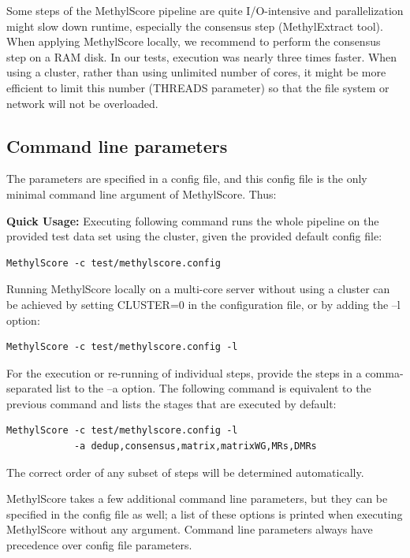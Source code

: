 \documentclass{article}
\begin{document}
Some steps of the MethylScore pipeline are quite I/O-intensive and parallelization might slow down runtime, especially the consensus step (MethylExtract tool). 
When applying MethylScore locally, we recommend to perform the consensus step on a RAM disk. In our tests, execution was nearly three times faster. When using a cluster, rather than using unlimited number of cores, it might be more efficient to limit this number (THREADS parameter) so that the file system or network will not be overloaded.

\subsection{Command line parameters}
\label{params}

The parameters are specified in a config file, and this config file is the only minimal command line argument of MethylScore. Thus:\\

\label{QuickUsage}
\textbf{Quick Usage:} Executing following command runs the whole pipeline on the provided test data set using the cluster, given the provided default config file:
\begin{lstlisting}
MethylScore -c test/methylscore.config
\end{lstlisting}

Running MethylScore locally on a multi-core server without using a cluster can be achieved by setting CLUSTER=0 in the configuration file, or by adding the --l option:
\begin{lstlisting}
MethylScore -c test/methylscore.config -l
\end{lstlisting}

For the execution or re-running of individual steps, provide the steps in a comma-separated list to the --a option. The following command is equivalent to the previous command and lists the stages that are executed by default:
\begin{lstlisting}
MethylScore -c test/methylscore.config -l
            -a dedup,consensus,matrix,matrixWG,MRs,DMRs
\end{lstlisting}
The correct order of any subset of steps will be determined automatically.

MethylScore takes a few additional command line parameters, but they can be specified in the config file as well; a list of these options is printed when executing MethylScore without any argument. Command line parameters always have precedence over config file parameters.
\end{document}

